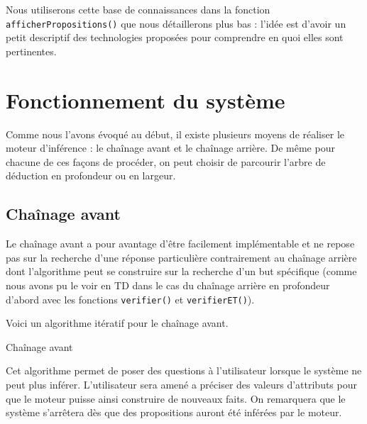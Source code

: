 \documentclass[a4paper,12pt]{article}
\begin{document}
Nous utiliserons cette base de connaissances dans la fonction \texttt{afficherPropositions()} que nous détaillerons plus bas : l'idée est d'avoir un petit descriptif des technologies proposées pour comprendre en quoi elles sont pertinentes.


\section{Fonctionnement du système}

Comme nous l'avons évoqué au début, il existe plusieurs moyens de réaliser le moteur d'inférence : le chaînage avant et le chaînage arrière. De même pour chacune de ces façons de procéder, on peut choisir de parcourir l'arbre de déduction en profondeur ou en largeur.

\subsection{Chaînage avant}

Le chaînage avant a pour avantage d'être facilement implémentable et ne repose pas sur la recherche d'une réponse particulière contrairement au chaînage arrière dont l'algorithme peut se construire sur la recherche d'un but spécifique (comme nous avons pu le voir en TD dans le cas du chaînage arrière en profondeur d'abord avec les fonctions \texttt{verifier()} et \texttt{verifierET()}).


Voici un algorithme itératif pour le chaînage avant.
\begin{algorithm}
\caption{Chaînage avant \label{algoChainageAvant}}
\end{algorithm}

Cet algorithme permet de poser des questions à l'utilisateur lorsque le système ne peut plus inférer. L'utilisateur sera amené a préciser des valeurs d'attributs pour que le moteur puisse ainsi construire de nouveaux faits. On remarquera que le système s'arrêtera dès que des propositions auront été inférées par le moteur.
\end{document}
